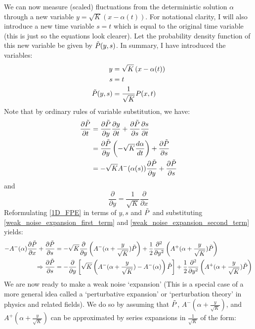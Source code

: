 We can now measure (scaled) fluctuations from the deterministic solution $\alpha$ through a new variable $y=\sqrt{K}\left(x-\alpha(t)\right)$. For notational clarity, I will also introduce a new time variable $s=t$ which is equal to the original time variable (this is just so the equations look clearer). Let the probability density function of this new variable be given by $\Tilde{P}(y,s)$. In summary, I have introduced the variables:
\begin{align*}
	y &= \sqrt{K}\left(x-\alpha(t)\right)\\
	s &= t\\
	\Tilde{P}(y,s) &= \frac{1}{\sqrt{K}}P(x,t)
\end{align*}
Note that by ordinary rules of variable substitution, we have:
\begin{align}
	\frac{\partial \Tilde{P}}{\partial t} &= \frac{\partial \Tilde{P}}{\partial y}\frac{\partial y}{\partial t} + \frac{\partial \Tilde{P}}{\partial s}\frac{\partial s}{\partial t}\nonumber\\
	&=\frac{\partial \Tilde{P}}{\partial y}\left( -\sqrt{K}\frac{d\alpha}{dt}\right) + \frac{\partial \Tilde{P}}{\partial s}\nonumber\\
	&= -\sqrt{K}A^{-}(\alpha(s))\frac{\partial \Tilde{P}}{\partial y} + \frac{\partial \Tilde{P}}{\partial s}\label{weak_noise_expansion_first_term}
\end{align}
and
\begin{equation}
	\label{weak_noise_expansion_second_term}
	\frac{\partial }{\partial y} = \frac{1}{\sqrt{K}}\frac{\partial }{\partial x}
\end{equation}
Reformulating \eqref{1D_FPE} in terms of $y,s$ and $\Tilde{P}$ and substituting \eqref{weak_noise_expansion_first_term} and \eqref{weak_noise_expansion_second_term} yields:
\begin{align}
	-A^-(\alpha)\frac{\partial\Tilde{P}}{\partial x} + \frac{\partial \Tilde{P}}{\partial s} &= -\sqrt{K}\frac{\partial}{\partial y}\left(A^-(\alpha+\frac{y}{\sqrt{K}})\Tilde{P}\right)+\frac{1}{2}\frac{\partial^2}{\partial y^2}\left(A^+(\alpha+\frac{y}{\sqrt{K}})\Tilde{P}\right)\nonumber\\
	\Rightarrow \frac{\partial \Tilde{P}}{\partial s} &= -\frac{\partial}{\partial y}\left[\sqrt{K}\left(A^-(\alpha+\frac{y}{\sqrt{K}})-A^-(\alpha)\right)\Tilde{P}\right]+\frac{1}{2}\frac{\partial^2}{\partial y^2}\left(A^+(\alpha+\frac{y}{\sqrt{K}})\Tilde{P}\right)\label{weak_noise_exact_equation}
\end{align}
We are now ready to make a weak noise `expansion' (This is a special case of a more general idea called a `perturbative expansion' or `perturbation theory' in physics and related fields). We do so by assuming that $\Tilde{P}$, $A^-(\alpha + \frac{y}{\sqrt{K}})$, and $A^+(\alpha+\frac{y}{\sqrt{K}})$ can be approximated by series expansions in $\frac{1}{\sqrt{K}}$ of the form:
